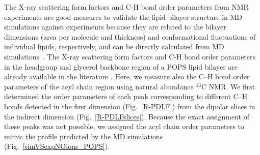 \documentclass[journal=jpcbfk,manuscript=article]{achemso}
\begin{document}
The X-ray scattering form factors and C-H bond order parameters from NMR experiments are good measures to validate
the lipid bilayer structure in MD simulations against experiments because they
are related to the bilayer dimensions (area per molecule and thickness) and
conformational fluctuations of individual lipids, respectively, and 
can be directly calculated from MD simulations~\cite{ollila16}.
The X-ray scattering form factors and C-H bond order parameters in
the headgroup and glycerol backbone region of a POPS lipid bilayer are already available in the literature \cite{kucerka14,NMRlipidsIV}.
Here, we measure also the C--H bond order parameters of the acyl chain region using natural abundance $^{13}$C NMR.
We first determined the order parameters of each peak corresponding to different C--H bonds detected
in the first dimension (Fig.~\ref{R-PDLF}) from the dipolar slices in the indirect dimension (Fig.~\ref{R-PDLFslices}).
Because the exact assignment of these peaks was not possible, we assigned the
acyl chain order parameters to mimic the profile predicted by the MD simulations (Fig.~\ref{simVSexpNOions_POPS}).
\end{document}
